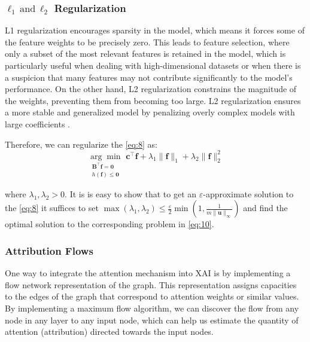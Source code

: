 \documentclass{article} %
\theoremstyle{bfnote}
\begin{document}
\subsubsection{$\ell_1 \hspace{2pt }\text{and}  \hspace{2pt}  \ell_2$ Regularization}

L1 regularization encourages sparsity in the model, which means it forces some of the feature weights to be precisely zero. This leads to feature selection, where only a subset of the most relevant features is retained in the model, which is particularly useful when dealing with high-dimensional datasets or when there is a suspicion that many features may not contribute significantly to the model's performance. On the other hand, L2 regularization constrains the magnitude of the weights, preventing them from becoming too large. L2 regularization ensures a more stable and generalized model by penalizing overly complex models with large coefficients \citep{yena}.

Therefore, we can regularize the \cref{eq:8} as:
\begin{equation}
	\underset{\substack{\bm{B}^{\top} \bm{f}=\bm{0} \\ h(\bm{f}) \leq \bm{0} }}{\arg \min } \hspace{4pt} \bm{c}^{\top} \bm{f} +\lambda_1 \|\bm{f}\|_1 +\lambda_2 \|\bm{f}\|_2^2
	\label{eq:10}
\end{equation}

where $\lambda_1, \lambda_2 >0$. It is is easy to show that to get an $\varepsilon$-approximate solution to the \cref{eq:8} it suffices to set $\max(\lambda_1, \lambda_2) \leq \frac{\varepsilon}{2} \min(1, \frac{1}{m \|\bm{u}\|_{\infty}})$ and find the optimal solution to the corresponding problem in \cref{eq:10}.\citep{boyd2004, bubeck2015}

\subsubsection{Attribution Flows}
One way to integrate the attention mechanism into XAI is by implementing a flow network representation of the graph. This representation assigns capacities to the edges of the graph that correspond to attention weights or similar values. By implementing a maximum flow algorithm, we can discover the flow from any node in any layer to any input node, which can help us estimate the quantity of attention (attribution) directed towards the input nodes.
\end{document}
